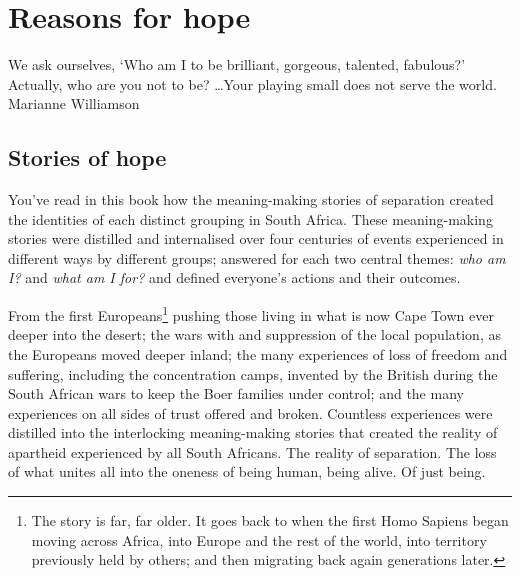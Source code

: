 ﻿%
\chapter{Reasons for hope}




\begin{chapterquotation}
We ask ourselves, ‘Who am I to be brilliant, gorgeous, talented, fabulous?’ Actually, who are you not to be? \ldots Your playing small does not serve the world.\\
\raggedleft \textemdash Marianne Williamson   
\end{chapterquotation}  


\section{Stories of hope}
You've read in this book how the meaning-making stories of separation created the identities of each distinct grouping in South Africa. These meaning-making stories were distilled and internalised over four centuries of events experienced in different ways by different groups; answered for each two central themes: \emph{who am I?} and \emph{what am I for?} and defined everyone’s actions and their outcomes.


From the first Europeans\footnote{The story is far, far older. It goes back to when the first Homo Sapiens began moving across Africa, into Europe and the rest of the world, into territory previously held by others; and then migrating back again generations later.} pushing those living in what is now Cape Town ever deeper into the desert; the wars with and suppression of the local population, as the Europeans moved deeper inland; the many experiences of loss of freedom and suffering, including the concentration camps, invented by the British during the South African wars to keep the Boer families under control; and the many experiences on all sides of trust offered and broken. Countless experiences were distilled into the interlocking meaning-making stories that created the reality of apartheid experienced by all South Africans. The reality of separation. The loss of what unites all into the oneness of being human, being alive. Of just being.


